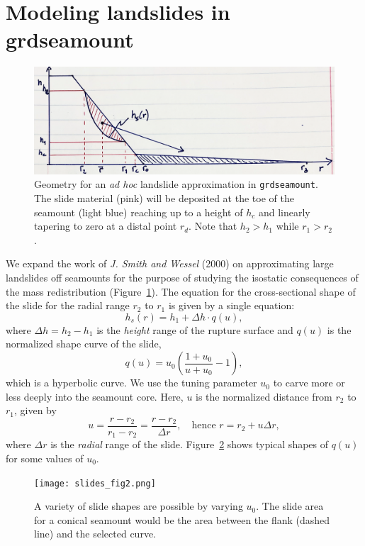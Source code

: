 \documentclass[12pt,letterpaper,margin=0.5in]{report}
\begin{document}
\section{Modeling landslides in grdseamount}

\begin{figure}[h!]
  \centering
  \includegraphics[width=5in]{slides_fig1.png}
  \caption{Geometry for an \emph{ad hoc} landslide approximation in \texttt{grdseamount}.  The slide material (pink)
  will be deposited at the toe of the seamount (light blue) reaching up to a height of $h_c$ and linearly
  tapering to zero at a distal point $r_d$. Note that $h_2 > h_1$ while $r_1 > r_2$.}
  \label{slides_fig1}
\end{figure}

We expand the work of {\it J. Smith and Wessel} (2000) on approximating large landslides off seamounts
for the purpose of studying the isostatic consequences of the mass redistribution (Figure~\ref{slides_fig1}).  The equation for the
cross-sectional shape of the slide for the radial range $r_2$ to $r_1$ is given by a single equation:
\begin{equation}
h_s(r) = h_1 + \Delta h \cdot q(u),
\end{equation}
where $\Delta h = h_2 - h_1$ is the \emph{height} range of the rupture surface and $q(u)$ is the normalized shape curve of the slide,
\begin{equation}
q(u) = u_0 \left (\frac{1 + u_0}{u + u_0} - 1 \right ),
\end{equation}
which is a hyperbolic curve. We use the tuning parameter $u_0$ to carve more or less deeply into the seamount core.
Here, $u$ is the normalized distance from $r_2$ to $r_1$, given by
\begin{equation}
u = \frac{r-r_2}{r_1 - r_2} = \frac{r-r_2}{\Delta r}, \quad \mbox{hence } r = r_2 + u \Delta r,
\end{equation}
where $\Delta r$ is the \emph{radial} range of the slide.
Figure~\ref{slides_fig2} shows typical shapes of $q(u)$ for some values of $u_0$.
\begin{figure}[h!]
  \centering
  \texttt{[image: slides\_fig2.png]}
  \caption{A variety of slide shapes are possible by varying $u_0$.  The slide area for a conical seamount would be the area
  between the flank (dashed line) and the selected curve.}
  \label{slides_fig2}
\end{figure}
\end{document}
